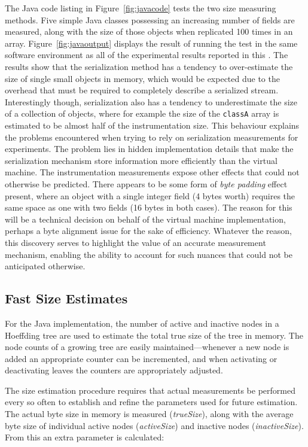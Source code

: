 The Java code listing in Figure~\ref{fig:javacode} tests the two size measuring methods. Five simple Java classes possessing an increasing number of fields are measured, along with the size of those objects when replicated 100 times in an array. Figure~\ref{fig:javaoutput} displays the result of running the test in the same software environment as all of the experimental results reported in this \thesisc.  The results show that the serialization method has a tendency to over-estimate the size of single small objects in memory, which would be expected due to the overhead that must be required to completely describe a serialized stream. Interestingly though, serialization also has a tendency to underestimate the size of a collection of objects, where for example the size of the \verb|classA| array is estimated to be almost half of the instrumentation size. This behaviour explains the problems encountered when trying to rely on serialization measurements for experiments. The problem lies in hidden implementation details that make the serialization mechanism store information more efficiently than the virtual machine. The instrumentation measurements expose other effects that could not otherwise be predicted. There appears to be some form of {\em byte padding} effect present, where an object with a single integer field (4 bytes worth) requires the same space as one with two fields (16 bytes in both cases). The reason for this will be a technical decision on behalf of the virtual machine implementation, perhaps a byte alignment issue for the sake of efficiency. Whatever the reason, this discovery serves to highlight the value of an accurate measurement mechanism, enabling the ability to account for such nuances that could not be anticipated otherwise. 

\subsection{Fast Size Estimates}
\label{sec:fastsizeest}

For the Java implementation, the number of active and inactive nodes in a Hoeffding tree are used to estimate the total true size of the tree in memory. The node counts of a growing tree are easily maintained---whenever a new node is added an appropriate counter can be incremented, and when activating or deactivating leaves the counters are appropriately adjusted.

The size estimation procedure requires that actual measurements be performed every so often to establish and refine the parameters used for future estimation. The actual byte size in memory is measured ({\em trueSize}), along with the average byte size of individual active nodes ({\em activeSize}) and inactive nodes  ({\em inactiveSize}). From this an extra parameter is calculated:

